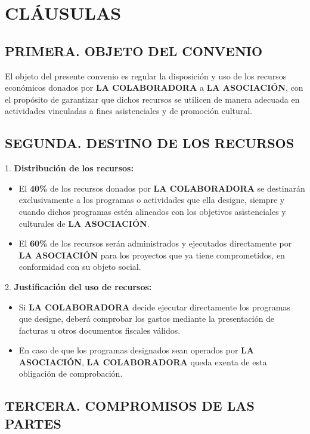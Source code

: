 \documentclass[a4paper,12pt]{article}
\begin{document}
\section*{CLÁUSULAS}

\subsection*{PRIMERA. OBJETO DEL CONVENIO}

El objeto del presente convenio es regular la disposición y uso de los recursos económicos donados por \textbf{LA COLABORADORA} a \textbf{LA ASOCIACIÓN}, con el propósito de garantizar que dichos recursos se utilicen de manera adecuada en actividades vinculadas a fines asistenciales y de promoción cultural.

\subsection*{SEGUNDA. DESTINO DE LOS RECURSOS}

1. \textbf{Distribución de los recursos:}
    \begin{itemize}
        \item El \textbf{40\%} de los recursos donados por \textbf{LA COLABORADORA} se destinarán exclusivamente a los programas o actividades que ella designe, siempre y cuando dichos programas estén alineados con los objetivos asistenciales y culturales de \textbf{LA ASOCIACIÓN}.
        \item El \textbf{60\%} de los recursos serán administrados y ejecutados directamente por \textbf{LA ASOCIACIÓN} para los proyectos que ya tiene comprometidos, en conformidad con su objeto social.
    \end{itemize}

2. \textbf{Justificación del uso de recursos:}
    \begin{itemize}
        \item Si \textbf{LA COLABORADORA} decide ejecutar directamente los programas que designe, deberá comprobar los gastos mediante la presentación de facturas u otros documentos fiscales válidos.
        \item En caso de que los programas designados sean operados por \textbf{LA ASOCIACIÓN}, \textbf{LA COLABORADORA} queda exenta de esta obligación de comprobación.
    \end{itemize}

\subsection*{TERCERA. COMPROMISOS DE LAS PARTES}
\end{document}
